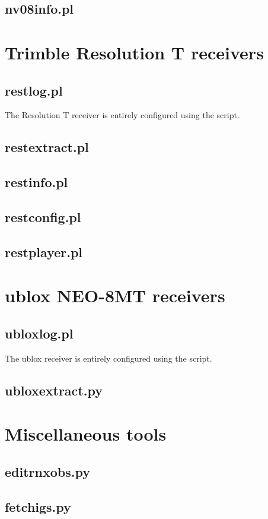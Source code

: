 \subsection{nv08info.pl}

\section{Trimble Resolution T receivers}

\subsection{restlog.pl}

\hypertarget{h:restlog}{}

The Resolution T receiver is entirely configured using the script.

\subsection{restextract.pl}

\subsection{restinfo.pl}

\subsection{restconfig.pl}

\subsection{restplayer.pl}

\section{ublox NEO-8MT receivers}

\subsection{ubloxlog.pl}

\hypertarget{h:ubloxlog}{}

The ublox receiver is entirely configured using the script.

\subsection{ubloxextract.py}




\section{Miscellaneous tools}







\subsection{editrnxobs.py}

\subsection{fetchigs.py}
